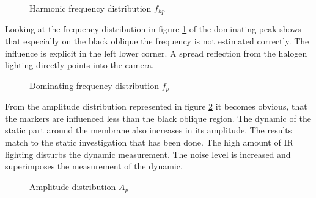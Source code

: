 \begin{figure}[!h]
	\hfill
	\centering
	\caption{Harmonic frequency distribution $f_{hp}$}
\end{figure}
\newpage

Looking at the frequency distribution in figure \ref{fig:Frequency_Distribution_lighting}
of the dominating peak shows that especially on the black oblique the frequency is not estimated correctly. The influence is explicit in the left lower corner. A spread reflection from the halogen lighting directly points into the camera.

\begin{figure}[!h]
	\hfill
	\centering
	\caption{Dominating frequency distribution $f_p$}
	\label{fig:Frequency_Distribution_lighting}
\end{figure}

From the amplitude distribution represented in figure \ref{fig:Amplitude_Distribution_lighting} it becomes obvious, that the markers are influenced less than the black oblique region. The dynamic of the static part around the membrane also increases in its amplitude. The results match to the static investigation that has been done. The high amount of IR lighting disturbs the dynamic measurement. The noise level is increased and superimposes the measurement of the dynamic. 

\begin{figure}[!h]
	\hfill
	\centering
	\caption{Amplitude distribution $A_p$}
	\label{fig:Amplitude_Distribution_lighting}
\end{figure}



